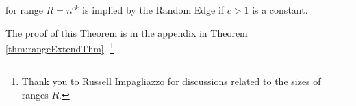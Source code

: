 \begin{theorem}
\Strongzkc for range $R=n^{c k}$ is implied by the Random Edge \RandomZKC if $c>1$ is a constant.
\end{theorem}

The proof of this Theorem is in the appendix in Theorem \ref{thm:rangeExtendThm}.
\footnote{Thank you to Russell Impagliazzo for discussions related to the sizes of ranges $R$.}


